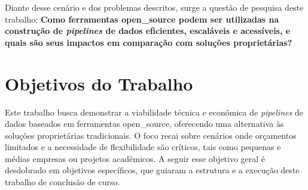 Diante desse cenário e dos problemas descritos, surge a questão de pesquisa deste trabalho: \textbf{Como ferramentas \acs{open_source} podem ser utilizadas na construção de \textit{pipelines} de dados eficientes, escaláveis e acessíveis, e quais são seus impactos em comparação com soluções proprietárias?} 

\section{Objetivos do Trabalho}
\label{sec:objetivo}

Este trabalho busca demonstrar a viabilidade técnica e econômica de \textit{pipelines} de dados baseados em ferramentas \acs{open_source}, oferecendo uma alternativa às soluções proprietárias tradicionais. O foco recai sobre cenários onde orçamentos limitados e a necessidade de flexibilidade são críticos, tais como pequenas e médias empresas ou projetos acadêmicos. A seguir esse objetivo geral é desdobrado em objetivos específicos, que guiaram a estrutura e a execução deste trabalho de conclusão de curso.

